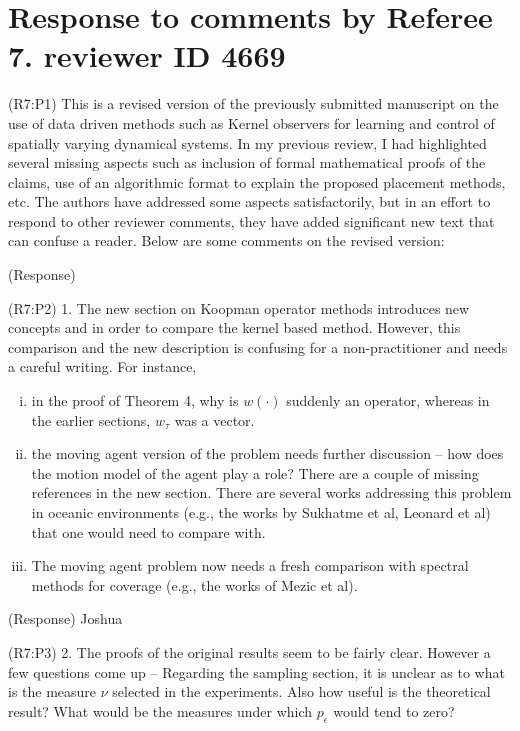 \documentclass{letter}
\begin{document}
\section{Response to comments by Referee 7. reviewer ID 4669}

{\color{red}(R7:P1)} This is a revised version of the previously submitted manuscript on the use of data driven methods such as Kernel observers for learning and
control of spatially varying dynamical systems. In my previous review, I had highlighted several missing aspects such as inclusion of formal
mathematical proofs of the claims, use of an algorithmic format to explain the proposed placement methods, etc.
The authors have addressed some aspects satisfactorily, but in an effort to respond to other reviewer comments, they have added
significant new text that can confuse a reader. Below are some comments on the revised version:

{\color{red}(Response)} 

{\color{red}(R7:P2)} 1. The new section on Koopman operator methods introduces new concepts and in order to compare the kernel based method. However, this
comparison and the new description is confusing for a non-practitioner and needs a careful writing. For instance,
\begin{enumerate}[(i)]
	\item in the proof of Theorem 4, why is $w(\cdot)$ suddenly an operator, whereas in the earlier sections, $w_\tau$ was a vector.
	\item the moving agent version of the problem needs further discussion -- how does the motion model of the agent play a role? There are a couple of missing references in the new section. There are several works	addressing this problem in oceanic environments (e.g., the works by	Sukhatme et al, Leonard et al) that one would need to compare with.
	\item The moving agent problem now needs a fresh comparison with spectral methods for coverage (e.g., the works of Mezic et al). 
\end{enumerate}

{\color{red}(Response)} Joshua


{\color{red}(R7:P3)} 2. The proofs of the original results seem to be fairly clear. However a few questions come up -- Regarding the sampling section, it is
unclear as to what is the measure $\nu$ selected in the experiments. Also how useful is the theoretical result? What would be the measures under which $p_\epsilon$ would tend to zero?  
\end{document}
